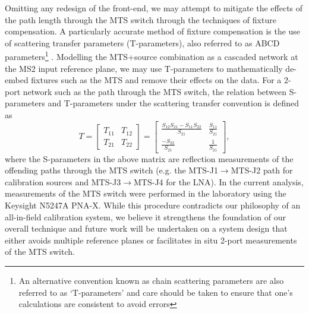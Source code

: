 Omitting any redesign of the front-end, we may attempt to mitigate the effects of the path length through the MTS switch through the techniques of fixture compensation. A particularly accurate method of fixture compensation is the use of scattering transfer parameters (T-parameters), also referred to as ABCD parameters\footnote{An alternative convention known as chain scattering parameters are also referred to as ‘T-parameters’ and care should be taken to ensure that one’s calculations are consistent to avoid errors} \citep{pozar}. Modelling the MTS+source combination as a cascaded network at the MS2 input reference plane, we may use T-parameters to mathematically de-embed fixtures such as the MTS and remove their effects on the data. For a 2-port network such as the path through the MTS switch, the relation between S-parameters and T-parameters under the scattering transfer convention is defined as
\begin{equation}
    T = \begin{bmatrix}
        T_{11} & T_{12} \\
        T_{21} & T_{22}
    \end{bmatrix}
    =
    \begin{bmatrix}
        \frac{S_{12}S_{21}-S_{11}S_{22}}{S_{21}} & \frac{S_{11}}{S_{21}} \\
        \frac{-S_{22}}{S_{21}} & \frac{1}{S_{21}}
    \end{bmatrix},
    \label{eqn:tparams}
\end{equation}
where the S-parameters in the above matrix are reflection measurements of the offending paths through the MTS switch (e.g. the MTS-J1$\rightarrow$MTS-J2 path for calibration sources and MTS-J3$\rightarrow$MTS-J4 for the LNA). In the current analysis, measurements of the MTS switch were performed in the laboratory using the Keysight N5247A PNA-X. While this procedure contradicts our philosophy of an all-in-field calibration system, we believe it strengthens the foundation of our overall technique and future work will  be undertaken on a system design that either avoids multiple reference planes or facilitates in situ 2-port measurements of the MTS switch.

